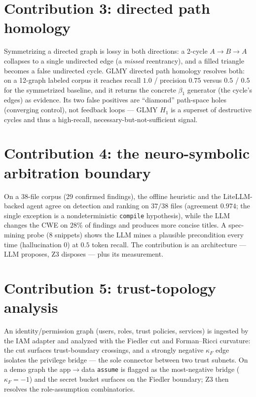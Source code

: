 \documentclass[11pt]{article}
\begin{document}
\section{Contribution 3: directed path homology}
Symmetrizing a directed graph is lossy in both directions: a 2-cycle
$A\to B\to A$ collapses to a single undirected edge (a \emph{missed} reentrancy),
and a filled triangle becomes a false undirected cycle. GLMY directed path
homology resolves both: on a 12-graph labeled corpus it reaches recall $1.0$ /
precision $0.75$ versus $0.5$ / $0.5$ for the symmetrized baseline, and it
returns the concrete $\beta_1$ generator (the cycle's edges) as evidence. Its two
false positives are ``diamond'' path-space holes (converging control), not
feedback loops --- GLMY $H_1$ is a superset of destructive cycles and thus a
high-recall, necessary-but-not-sufficient signal.

\section{Contribution 4: the neuro-symbolic arbitration boundary}
On a 38-file corpus (29 confirmed findings), the offline heuristic and the
LiteLLM-backed agent agree on detection and ranking on $37/38$ files (agreement
$0.974$; the single exception is a nondeterministic \texttt{compile} hypothesis),
while the LLM changes the CWE on $28\%$ of findings and produces more concise
titles. A spec-mining probe (8 snippets) shows the LLM mines a plausible
precondition every time (hallucination $0$) at $0.5$ token recall. The
contribution is an architecture --- LLM proposes, Z3 disposes --- plus its
measurement.

\section{Contribution 5: trust-topology analysis}
An identity/permission graph (users, roles, trust policies, services) is ingested
by the IAM adapter and analyzed with the Fiedler cut and Forman--Ricci curvature:
the cut surfaces trust-boundary crossings, and a strongly negative $\kappa_F$
edge isolates the privilege bridge --- the sole connector between two trust
subnets. On a demo graph the app$\to$data \texttt{assume} is flagged as the
most-negative bridge ($\kappa_F=-1$) and the secret bucket surfaces on the Fiedler
boundary; Z3 then resolves the role-assumption combinatorics.
\end{document}
